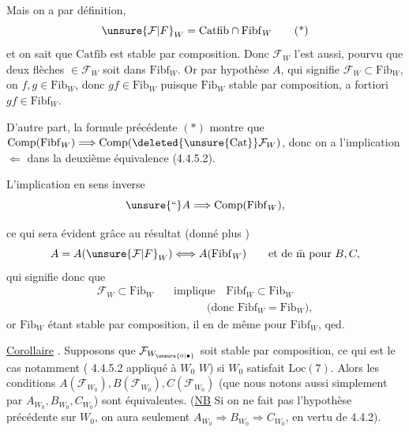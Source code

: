 Mais on a par définition,
\[
 \unsure{\mathcal{F}|F}_{W}=\mathrm{Catfib}\cap\mathrm{Fibf}_{W} \tag*{(*)}
\]
et on sait que $\mathrm{Catfib}$ est stable par composition. Donc $\mathcal{F}_{W}$ l'est aussi, pourvu que   deux flèches $\in\mathcal{F}_{W}$ soit dans $\mathrm{Fibf}_{W}$. Or par hypothèse $A$, qui signifie $\mathcal{F}_{W}\subset\mathrm{Fib}_{W}$, on  $f,g\in\mathrm{Fib}_{W}$, donc $gf\in\mathrm{Fib}_{W}$ puisque $\mathrm{Fib}_{W}$ stable par composition, a fortiori $gf\in\mathrm{Fibf}_{W}$.

D'autre part, la formule précédente $(*)$ montre que $\mathrm{Comp}(\mathrm{Fibf}_{W})\Longrightarrow\mathrm{Comp}(\deleted{\unsure{\mathrm{Cat}}}\mathcal{F}_{W})$, donc on a  l'implication $\Longleftarrow$ dans la deuxième équivalence (4.4.5.2).

L'implication en sens inverse  
\[
 \unsure{\text{``}}A\Longrightarrow\mathrm{Comp}(\mathrm{Fibf}_{W}),
\]

ce qui sera évident  grâce au résultat (donné plus )
\[
 A=A(\unsure{\mathcal{F}|F}_{W})\Longleftrightarrow A(\mathrm{Fibf}_{W})
 \qquad\text{et de \={m} pour }B,C,
\]
qui signifie donc que 
\[
 \begin{aligned}
 \mathcal{F}_{W}\subset\mathrm{Fib}_{W}&\quad\text{implique}\quad\mathrm{Fibf}_{W}\subset\mathrm{Fib}_{W}\\
 &\hspace{4em}\text{(donc }\mathrm{Fibf}_{W}=\mathrm{Fib}_{W}),
 \end{aligned}
\]
or $\mathrm{Fib}_{W}$ étant stable par composition, il en  de même pour $\mathrm{Fibf}_{W}$, qed.

\uline{Corollaire} . Supposons que $\mathcal{F}_{W_{\unsure{0|\bullet}}}$ soit stable par composition, ce qui est le cas notamment ( 4.4.5.2 appliqué à $W_0$  $W$) si $W_0$ satisfait $\mathrm{Loc}(7)$. Alors les conditions $A(\mathcal{F}_{W_0}),B(\mathcal{F}_{W_0}),C(\mathcal{F}_{W_0})$  (que nous notons aussi simplement par $A_{W_0},B_{W_0},C_{W_0}$) sont équivalentes. (\uline{NB} Si on ne fait pas l'hypothèse précédente sur $W_0$, on aura seulement $A_{W_0}\Longrightarrow B_{W_0}\Longrightarrow C_{W_0}$, en vertu de 4.4.2).

